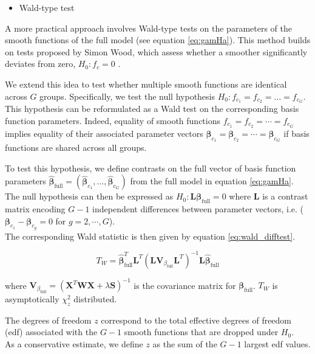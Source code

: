 \begin{itemize}
    \item Wald-type test
\end{itemize}

A more practical approach involves Wald-type tests on the parameters of the smooth functions of the full model (see equation \ref{eq:gamHa}). This method builds on tests proposed by Simon Wood, which assess whether a smoother significantly deviates from zero, $H_0 : f_c = 0$ \cite{Wald}.

We extend this idea to test whether multiple smooth functions are identical across $G$ groups. Specifically, we test the null hypothesis $H_0 : f_{c_1} = f_{c_2} = \dots = f_{c_G}$. 
This hypothesis can be reformulated as a Wald test on the corresponding basis function parameters. Indeed, equality of smooth functions $f_{c_1} = f_{c_2} = \cdots = f_{c_G}$ implies equality of their associated parameter vectors $\boldsymbol{\beta}_{c_1} = \boldsymbol{\beta}_{c_2} = \cdots = \boldsymbol{\beta}_{c_G}$ if basis functions are shared across all groups.

To test this hypothesis, we define contrasts on the full vector of basis function parameters $\hat{\boldsymbol{\beta}}_{\text{full}} = (\hat{\boldsymbol{\beta}}_{c_1}, \dots, \hat{\boldsymbol{\beta}}_{c_G})$ from the full model in equation \ref{eq:gamHa}. The null hypothesis can then be expressed as $H_0: \boldsymbol{L}\boldsymbol{\beta}_{\text{full}} = 0$ where $\boldsymbol{L}$ is a contrast matrix encoding $G-1$ independent differences between parameter vectors, i.e. ($\boldsymbol{\beta}_{c_1} - \boldsymbol{\beta}_{c_g} = 0$ for $g = 2,\cdots,G$).\\
The corresponding Wald statistic is then given by equation \ref{eq:wald_difftest}.

\begin{equation}
    T_{W} = \hat{\boldsymbol{\beta}}_{\text{full}}^T\boldsymbol{L}^T(\boldsymbol{L}\boldsymbol{V}_{\beta_{\text{full}}} \boldsymbol{L}^T)^{-1} \boldsymbol{L}\hat{\boldsymbol{\beta}}_{\text{full}}
    \label{eq:wald_difftest}
\end{equation}

where $\boldsymbol{V}_{\beta_{\text{full}}} = (\boldsymbol{X}^T\boldsymbol{W}\boldsymbol{X} + \lambda \boldsymbol{S})^{-1}$ is the covariance matrix for $\boldsymbol{\beta}_{\text{full}}$. $T_W$ is asymptotically $\chi^2_z$ distributed. 

The degrees of freedom $z$ correspond to the total effective degrees of freedom (edf) associated with the $G-1$ smooth functions that are dropped under $H_0$.\\
As a conservative estimate, we define $z$ as the sum of the $G-1$ largest edf values.

